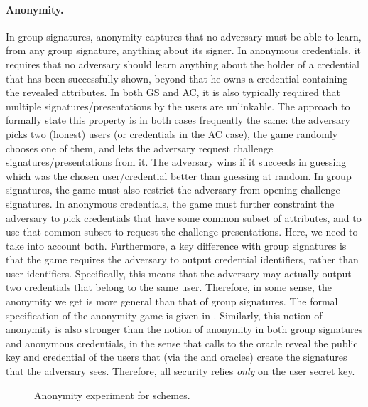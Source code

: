 \paragraph{Anonymity.} %
In group signatures, anonymity captures that no adversary must be able to learn,
from any group signature, anything about its signer. In anonymous credentials,
it requires that no adversary should learn anything about the holder of a
credential that has been successfully shown, beyond that he owns a credential
containing the revealed attributes. In both GS and AC, it is also typically
required that
multiple signatures/presentations by the users are unlinkable. The approach to
formally state this property is in both cases frequently the same: the adversary
picks two (honest) users (or credentials in the AC case), the game randomly
chooses one of them, and lets the adversary request challenge
signatures/presentations from it. The adversary wins if it succeeds in guessing
which was the chosen user/credential better than guessing at random. In group
signatures, the game must also restrict the adversary from opening challenge
signatures. In anonymous credentials, the game must further constraint the
adversary to pick credentials that have some common subset of attributes, and
to use that common subset to request the challenge presentations. Here, we need
to take into account both. Furthermore, a key difference with group signatures
is that the game requires the adversary to output credential identifiers, rather
than user identifiers. Specifically, this means that the adversary may actually
output two credentials that belong to the same user. Therefore, in some sense,
the anonymity we get is more general than that of group signatures. The formal
specification of the anonymity game is given in .
%
Similarly, this notion of anonymity is also stronger than the notion of
anonymity in both group signatures and anonymous credentials, in the sense
that calls to the \OPEN oracle reveal the public key and credential of the users
that (via the \SIGN and \CHALb oracles) create the signatures that the adversary
sees. Therefore, all security relies \emph{only} on the user secret key.

\begin{figure}[htp!]
  \caption{Anonymity experiment for \GSAC schemes.}
  \label{fig:exp-gsac-anonb}
\end{figure}

